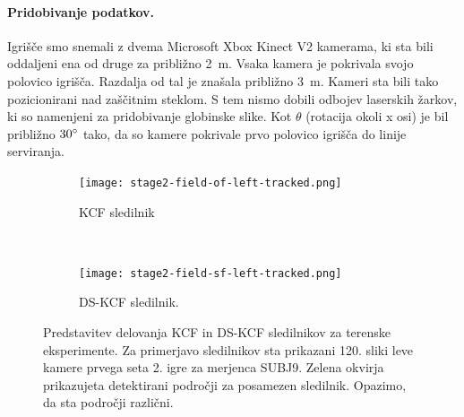 \paragraph{Pridobivanje podatkov.}
Igrišče smo snemali z dvema Microsoft Xbox Kinect V2 kamerama, ki sta bili oddaljeni ena od druge za približno \SI{2}{m}. Vsaka kamera je pokrivala svojo polovico igrišča. Razdalja od tal je znašala približno \SI{3}{m}. Kameri sta bili tako pozicionirani nad zaščitnim steklom. S tem nismo dobili odbojev laserskih žarkov, ki so namenjeni za pridobivanje globinske slike. Kot $\theta$ (rotacija okoli x osi) je bil približno $30^\circ$ tako, da so kamere pokrivale prvo polovico igrišča do linije serviranja.

\begin{figure}[!htb]
	\centering
	\begin{subfigure}{0.45\columnwidth}
		\centering
		\texttt{[image: stage2-field-of-left-tracked.png]}
		\caption{KCF sledilnik}
	\end{subfigure}
	~
	\begin{subfigure}{0.45\columnwidth}
		\centering
		\texttt{[image: stage2-field-sf-left-tracked.png]}
		\caption{DS-KCF sledilnik.}
	\end{subfigure}
	\caption[Predstavitev delovanja KCF in DS-KCF sledilnikov]{Predstavitev delovanja KCF in DS-KCF sledilnikov za terenske eksperimente. Za primerjavo sledilnikov sta prikazani 120. sliki leve kamere prvega seta 2. igre za merjenca SUBJ9. Zelena okvirja prikazujeta detektirani področji za posamezen sledilnik. Opazimo, da sta področji različni.}
	\label{fig:stage2-field-tracked}
\end{figure}




